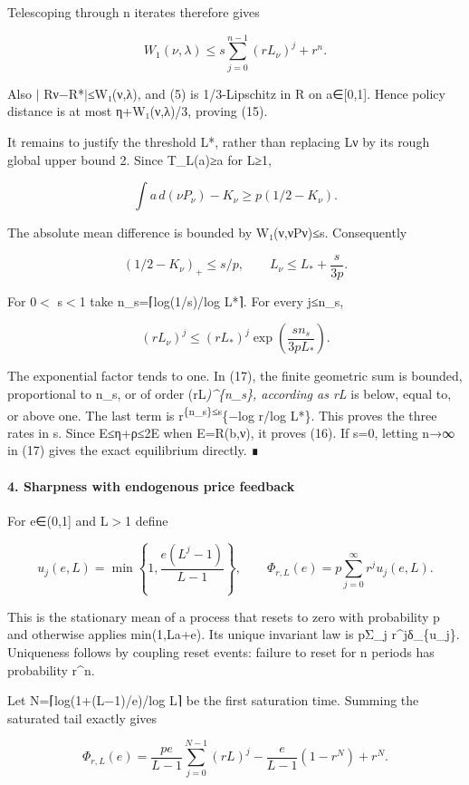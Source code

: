 \documentclass{article}
\begin{document}
Telescoping through n iterates therefore gives

\[
W_1(\nu,\lambda)\le
s\sum_{j=0}^{n-1}(rL_\nu)^j+r^n.
\tag{17}
\]

Also \(\vert\) Rν−R*\(\vert\)≤W₁(ν,λ), and (5) is 1/3-Lipschitz in R on a∈[0,1]. Hence policy distance is at most η+W₁(ν,λ)/3, proving (15).

It remains to justify the threshold L*, rather than replacing Lν by its rough global upper bound 2. Since T\_L(a)≥a for L≥1,

\[
\int a\,d(\nu P_\nu)-K_\nu
\ge p(1/2-K_\nu).
\]

The absolute mean difference is bounded by W₁(ν,νPν)≤s. Consequently

\[
(1/2-K_\nu)_+\le s/p,\qquad
L_\nu\le L_*+\frac{s}{3p}.
\tag{18}
\]

For 0\(\lt\) s\(\lt\)1 take n\_s=⌈log(1/s)/log L*⌉. For every j≤n\_s,

\[
(rL_\nu)^j\le
(rL_*)^j\exp\!\left(\frac{s n_s}{3pL_*}\right).
\]

The exponential factor tends to one. In (17), the finite geometric sum is bounded, proportional to n\_s, or of order (rL\emph{)\^{}\{n\_s\}, according as rL} is below, equal to, or above one. The last term is r\textsuperscript{\{n\_s\}≤s}\{−log r/log L*\}. This proves the three rates in s. Since E≤η+ρ≤2E when E=R(b,ν), it proves (16). If s=0, letting n→∞ in (17) gives the exact equilibrium directly. ∎

\paragraph{4. Sharpness with endogenous price feedback}

For e∈(0,1] and L\(\gt\)1 define

\[
u_j(e,L)=\min\left\{1,\frac{e(L^j-1)}{L-1}\right\},\qquad
\Phi_{r,L}(e)=p\sum_{j=0}^{\infty}r^j u_j(e,L).
\tag{19}
\]

This is the stationary mean of a process that resets to zero with probability p and otherwise applies min(1,La+e). Its unique invariant law is pΣ\_j r\^{}jδ\_\{u\_j\}. Uniqueness follows by coupling reset events: failure to reset for n periods has probability r\^{}n.

Let N=⌈log(1+(L−1)/e)/log L⌉ be the first saturation time. Summing the saturated tail exactly gives

\[
\Phi_{r,L}(e)=
\frac{pe}{L-1}\sum_{j=0}^{N-1}(rL)^j
-\frac{e}{L-1}(1-r^N)+r^N.
\tag{20}
\]
\end{document}
